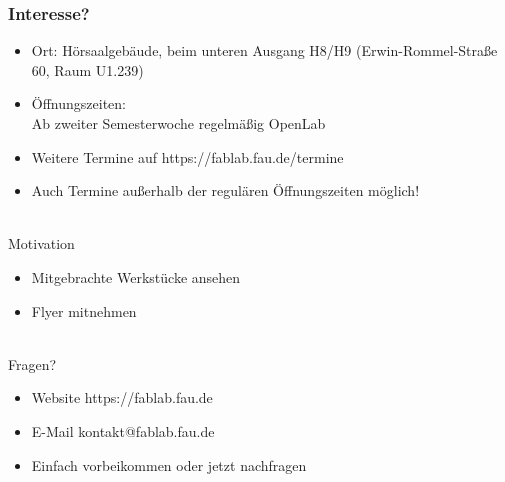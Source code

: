 \documentclass[t]{beamer}
\begin{document}
\begin{frame}
	\frametitle{Interesse?}
	
	\begin{itemize}
		\item Ort: Hörsaalgebäude, beim unteren Ausgang H8/H9 (Erwin-Rommel-Straße 60, Raum U1.239)
		\item Öffnungszeiten: \\Ab zweiter Semesterwoche regelmäßig OpenLab
		\item Weitere Termine auf {\color{blue} https://fablab.fau.de/termine}
		\item Auch Termine außerhalb der regulären Öffnungszeiten möglich!
	\end{itemize}
	~\\
	Motivation
	\begin{itemize}
		\item Mitgebrachte Werkstücke ansehen
		\item Flyer mitnehmen
	\end{itemize}
	~\\
	Fragen?
	\begin{itemize}
		\item Website {\color{blue} https://fablab.fau.de}
		\item E-Mail {\color{blue} kontakt@fablab.fau.de}
		\item Einfach vorbeikommen oder jetzt nachfragen
	\end{itemize}
\end{frame}

% 

\end{document}
